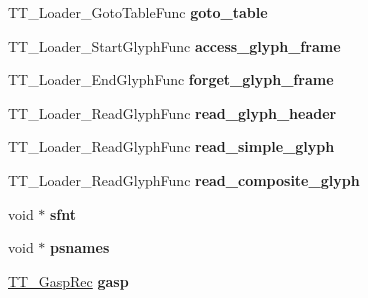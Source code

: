 \begin{DoxyCompactItemize}
\item 
T\+T\+\_\+\+Loader\+\_\+\+Goto\+Table\+Func {\bfseries goto\+\_\+table}\hypertarget{struct_t_t___face_rec___a3e2e3599abb7737179dbb2fbbd15355d}{}\label{struct_t_t___face_rec___a3e2e3599abb7737179dbb2fbbd15355d}

\item 
T\+T\+\_\+\+Loader\+\_\+\+Start\+Glyph\+Func {\bfseries access\+\_\+glyph\+\_\+frame}\hypertarget{struct_t_t___face_rec___a67cce5f4da277e6c8a47d8efe95bc58c}{}\label{struct_t_t___face_rec___a67cce5f4da277e6c8a47d8efe95bc58c}

\item 
T\+T\+\_\+\+Loader\+\_\+\+End\+Glyph\+Func {\bfseries forget\+\_\+glyph\+\_\+frame}\hypertarget{struct_t_t___face_rec___ac86fbd960fe6c919eb82cd7233655894}{}\label{struct_t_t___face_rec___ac86fbd960fe6c919eb82cd7233655894}

\item 
T\+T\+\_\+\+Loader\+\_\+\+Read\+Glyph\+Func {\bfseries read\+\_\+glyph\+\_\+header}\hypertarget{struct_t_t___face_rec___a343db3c51a3047324fea455ac06d7cb3}{}\label{struct_t_t___face_rec___a343db3c51a3047324fea455ac06d7cb3}

\item 
T\+T\+\_\+\+Loader\+\_\+\+Read\+Glyph\+Func {\bfseries read\+\_\+simple\+\_\+glyph}\hypertarget{struct_t_t___face_rec___aa9f550ad4e10d8232cdd3427e02e7603}{}\label{struct_t_t___face_rec___aa9f550ad4e10d8232cdd3427e02e7603}

\item 
T\+T\+\_\+\+Loader\+\_\+\+Read\+Glyph\+Func {\bfseries read\+\_\+composite\+\_\+glyph}\hypertarget{struct_t_t___face_rec___ac261cd70ce36c35c615fc5e2319b40c4}{}\label{struct_t_t___face_rec___ac261cd70ce36c35c615fc5e2319b40c4}

\item 
void $\ast$ {\bfseries sfnt}\hypertarget{struct_t_t___face_rec___a4c198db893da1900ee0384969d10f9f6}{}\label{struct_t_t___face_rec___a4c198db893da1900ee0384969d10f9f6}

\item 
void $\ast$ {\bfseries psnames}\hypertarget{struct_t_t___face_rec___a68cd8f2554793512af611422092b4814}{}\label{struct_t_t___face_rec___a68cd8f2554793512af611422092b4814}

\item 
\hyperlink{struct_t_t___gasp__}{T\+T\+\_\+\+Gasp\+Rec} {\bfseries gasp}\hypertarget{struct_t_t___face_rec___a042468253b53931f4901ac47e37fbe14}{}\label{struct_t_t___face_rec___a042468253b53931f4901ac47e37fbe14}


\end{DoxyCompactItemize}
